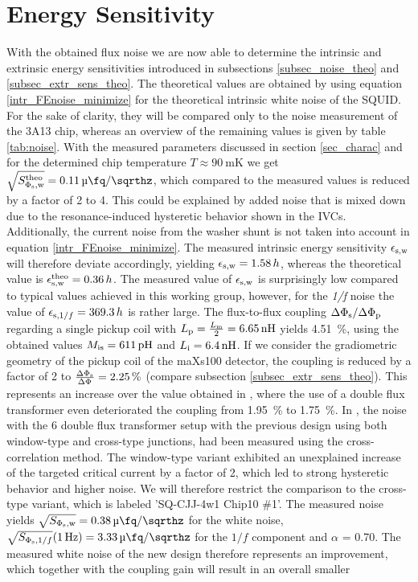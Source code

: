 \section{Energy Sensitivity}

With the obtained flux noise we are now able to determine the intrinsic and extrinsic energy sensitivities introduced in subsections \ref{subsec_noise_theo} and \ref{subsec_extr_sens_theo}. The theoretical values are obtained by using equation \ref{intr_FEnoise_minimize} for the theoretical intrinsic white noise of the SQUID. For the sake of clarity, they will be compared only to the noise measurement of the 3A13 chip, whereas an overview of the remaining values is given by table \ref{tab:noise}. With the measured parameters discussed in section \ref{sec_charac} and for the determined chip temperature $T\approx \qty{90}{\milli\kelvin}$ we get $\sqrt{S_{\rm \Phi_{\rm s},w}^{\rm theo}}=\qty{0.11}{\micro\fq\per\sqrthz}$, which compared to the measured values is reduced by a factor of 2 to 4. This could be explained by added noise that is mixed down due to the resonance-induced hysteretic behavior shown in the IVCs. Additionally, the current noise from the washer shunt is not taken into account in equation \ref{intr_FEnoise_minimize}. The measured intrinsic energy sensitivity $\epsilon_{\rm s,w}$ will therefore deviate accordingly, yielding $\epsilon_{\rm s,w}=1.58\, h$, whereas the theoretical value is $\epsilon_{\rm s,w}^{\rm theo}=0.36\, h$. The measured value of $\epsilon_{\rm s,w}$ is surprisingly low compared to typical values achieved in this working group, however, for the \textit{1/f} noise the value of $\epsilon_{{\rm s},1/f}=369.3\, h$ is rather large. The flux-to-flux coupling $\Delta\Phi_{\rm s}/\Delta\Phi_{\rm p}$ regarding a single pickup coil with $L_{\rm p}=\frac{L_{\rm m}}{2}=\qty{6.65}{\nH}$ yields \qty{4.51}{\percent}, using the obtained values $M_{\rm is}=\qty{611}{\pH}$ and  $L_{\rm i}=\qty{6.4}{\nH}$. If we consider the gradiometric geometry of the pickup coil of the maXs100 detector, the coupling is reduced by a factor of 2 to $\frac{\Delta\Phi_{\rm s}}{\Delta\Phi_{\rm }}=\qty{2.25}{\percent}$ (compare subsection \ref{subsec_extr_sens_theo}). This represents an increase over the value obtained in \cite{Bauer2022}, where the use of a double flux transformer even deteriorated the coupling from \qty{1.95}{\percent} to \qty{1.75}{\percent}. In \cite{Bauer2022}, the noise with the \qty{6}{\nH} double flux transformer setup with the previous design using both window-type and cross-type junctions, had been measured using the cross-correlation method. The window-type variant exhibited an unexplained increase of the targeted critical current by a factor of 2, which led to strong hysteretic behavior and higher noise. We will therefore restrict the comparison to the cross-type variant, which is labeled 'SQ-CJJ-4w1 Chip10 $\#$1'. The measured noise yields $\sqrt{S_{\rm \Phi_{\rm s},w}}=\qty{0.38}{\micro\fq\per\sqrthz}$ for the white noise, $\sqrt{S_{\Phi_{\rm s},1/f}}(\qty{1}{\Hz})=\qty{3.33}{\micro\fq\per\sqrthz}$ for the $1/f$ component and $\alpha$ = 0.70. The measured white noise of the new design therefore represents an improvement, which together with the coupling gain will result in an overall smaller 